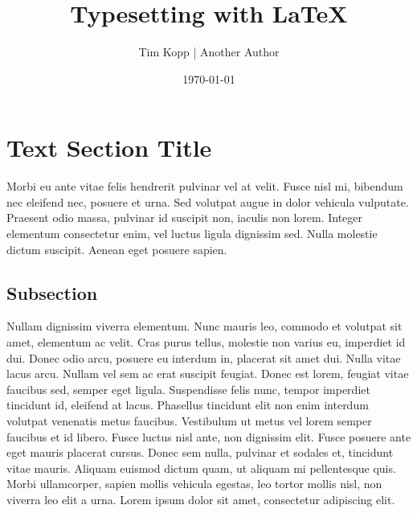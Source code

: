 \documentclass{article}
\title{Typesetting with \LaTeX}
\author{Tim Kopp | Another Author}
\date{\today}
\begin{document}
\maketitle


\newpage

\tableofcontents

\newpage

\section{Text Section Title}
Morbi eu ante vitae felis hendrerit pulvinar vel at velit. Fusce nisl mi,
bibendum nec eleifend nec, posuere et urna. Sed volutpat augue in dolor vehicula
vulputate. Praesent odio massa, pulvinar id suscipit non, iaculis non lorem.
Integer elementum consectetur enim, vel luctus ligula dignissim sed. Nulla
molestie dictum suscipit. Aenean eget posuere sapien.

\subsection{Subsection}
Nullam dignissim viverra elementum. Nunc mauris leo, commodo et volutpat sit
amet, elementum ac velit. Cras purus tellus, molestie non varius eu, imperdiet
id dui. Donec odio arcu, posuere eu interdum in, placerat sit amet dui. Nulla
vitae lacus arcu. Nullam vel sem ac erat suscipit feugiat. Donec est lorem,
feugiat vitae faucibus sed, semper eget ligula. Suspendisse felis nunc, tempor
imperdiet tincidunt id, eleifend at lacus. Phasellus tincidunt elit non enim
interdum volutpat venenatis metus faucibus. Vestibulum ut metus vel lorem semper
faucibus et id libero. Fusce luctus nisl ante, non dignissim elit. Fusce posuere
ante eget mauris placerat cursus. Donec sem nulla, pulvinar et sodales et,
tincidunt vitae mauris. Aliquam euismod dictum quam, ut aliquam mi pellentesque
quis. Morbi ullamcorper, sapien mollis vehicula egestas, leo tortor mollis nisl,
non viverra leo elit a urna. Lorem ipsum dolor sit amet, consectetur adipiscing
elit.
\end{document}
